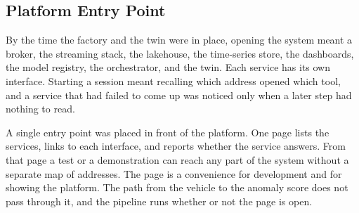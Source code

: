 \subsection{Platform Entry Point}
\label{subsec:arch_platform_portal}

By the time the factory and the twin were in place, opening the system meant a broker, the streaming stack, the lakehouse, the time-series store, the dashboards, the model registry, the orchestrator, and the twin. Each service has its own interface. Starting a session meant recalling which address opened which tool, and a service that had failed to come up was noticed only when a later step had nothing to read.

A single entry point was placed in front of the platform. One page lists the services, links to each interface, and reports whether the service answers. From that page a test or a demonstration can reach any part of the system without a separate map of addresses. The page is a convenience for development and for showing the platform. The path from the vehicle to the anomaly score does not pass through it, and the pipeline runs whether or not the page is open.

